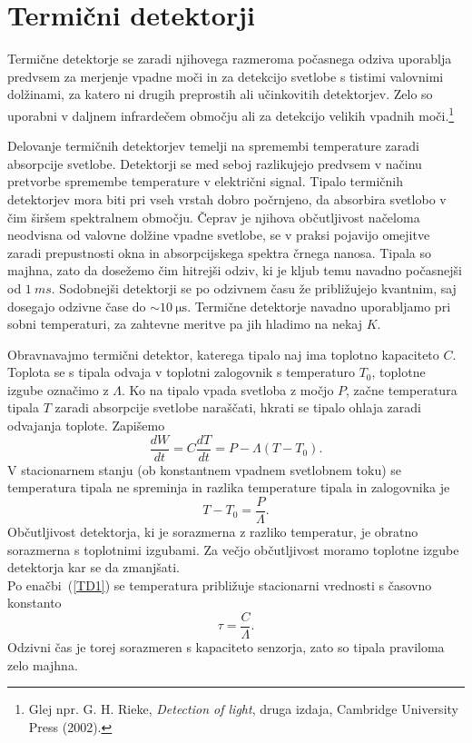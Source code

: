 \section{Termični detektorji}
Termične detektorje se zaradi njihovega razmeroma počasnega odziva uporablja predvsem 
za merjenje vpadne moči in za detekcijo svetlobe s tistimi valovnimi dolžinami, za katero 
ni drugih preprostih ali učinkovitih detektorjev. Zelo so uporabni v daljnem
infrardečem območju ali za detekcijo velikih vpadnih moči.\footnote{Glej npr. G. H. Rieke, {\it Detection 
of light}, druga izdaja, Cambridge University Press (2002).}

Delovanje termičnih detektorjev temelji na spremembi temperature zaradi absorpcije svetlobe. 
Detektorji se med seboj razlikujejo predvsem v načinu pretvorbe spremembe 
temperature v električni signal.
Tipalo termičnih detektorjev mora biti pri vseh vrstah dobro počrnjeno, da absorbira
svetlobo v čim širšem spektralnem območju. Čeprav je njihova občutljivost načeloma 
neodvisna od valovne dolžine vpadne svetlobe, se v praksi pojavijo omejitve zaradi
prepustnosti okna in absorpcijskega spektra črnega nanosa. Tipala so majhna, zato 
da dosežemo čim hitrejši odziv, ki je kljub temu navadno počasnejši od $1~\si{ms}$. 
Sodobnejši detektorji se po odzivnem času že približujejo 
kvantnim, saj dosegajo odzivne čase do $\sim 10~\si{\micro\second}$. 
Termične detektorje navadno uporabljamo pri sobni temperaturi,  
za zahtevne meritve pa jih hladimo na nekaj $\si{K}$. 

Obravnavajmo termični detektor, katerega tipalo naj ima toplotno kapaciteto $C$. Toplota
se s tipala odvaja v toplotni zalogovnik s temperaturo $T_0$, 
toplotne izgube označimo z $\Lambda$. Ko na tipalo vpada svetloba z močjo $P$, 
začne temperatura tipala $T$ zaradi absorpcije svetlobe naraščati, hkrati se tipalo 
ohlaja zaradi odvajanja toplote. Zapišemo
\begin{equation}
\frac{dW}{dt} = C \frac{dT}{dt} = P - \Lambda (T-T_0).
\label{TD1}
\end{equation}
V stacionarnem stanju (ob konstantnem vpadnem svetlobnem toku) se
temperatura tipala ne spreminja in razlika temperature tipala in zalogovnika je 
\begin{equation}
T - T_0 = \frac{P}{\Lambda}.
\label{temp_sens}
\end{equation}
Občutljivost detektorja, ki je sorazmerna z razliko temperatur, 
je obratno sorazmerna s toplotnimi izgubami. Za večjo občutljivost moramo
toplotne izgube detektorja kar se da zmanjšati. \\
Po enačbi~(\ref{TD1}) se temperatura približuje stacionarni vrednosti s časovno konstanto 
\begin{equation}
\tau = \frac{C}{\Lambda}.
\label{TermD_t}
\end{equation}
Odzivni čas je torej sorazmeren s kapaciteto senzorja, zato so tipala praviloma 
zelo majhna.

